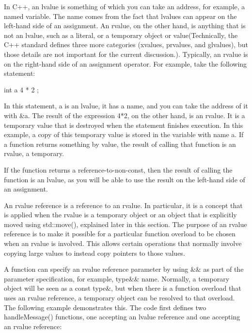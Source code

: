 
In C++, an lvalue is something of which you can take an address, for example, a named variable. The name comes from the fact that lvalues can appear on the left-hand side of an assignment. An rvalue, on the other hand, is anything that is not an lvalue, such as a literal, or a temporary object or value(Technically, the C++ standard defines three more categories (xvalues, prvalues, and glvalues), but those details are not important for the current discussion.). Typically, an rvalue is on the right-hand side of an assignment operator. For example, take the following statement:

\begin{cpp}
int a { 4 * 2 };
\end{cpp}

In this statement, a is an lvalue, it has a name, and you can take the address of it with \&a. The result of the expression 4*2, on the other hand, is an rvalue. It is a temporary value that is destroyed when the statement finishes execution. In this example, a copy of this temporary value is stored in the variable with name a.
If a function returns something by value, the result of calling that function is an rvalue, a temporary.

If the function returns a reference-to-non-const, then the result of calling the function is an lvalue, as you will be able to use the result on the left-hand side of an assignment.

An rvalue reference is a reference to an rvalue. In particular, it is a concept that is applied when the rvalue is a temporary object or an object that is explicitly moved using std::move(), explained later in this section. The purpose of an rvalue reference is to make it possible for a particular function overload to be chosen when an rvalue is involved. This allows certain operations that normally involve copying large values to instead copy pointers to those values.

A function can specify an rvalue reference parameter by using \&\& as part of the parameter specification, for example, type\&\& name. Normally, a temporary object will be seen as a const type\&, but when there is a function overload that uses an rvalue reference, a temporary object can be resolved to that overload. The following example demonstrates this. The code first defines two handleMessage() functions, one accepting an lvalue reference and one accepting an rvalue reference:

